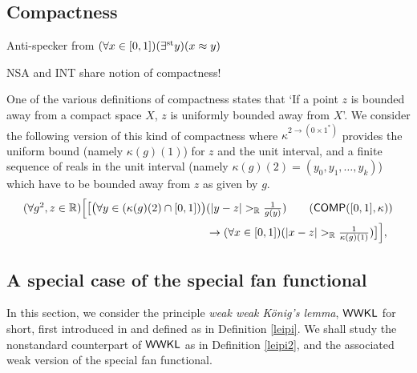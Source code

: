 \documentclass[reqno]{amsart}
\def\STP{\textup{\textsf{STP}}}
\def\WKL{\textup{\textsf{WKL}}}
\def\WWKL{\textup{\textsf{WWKL}}}
\def\R{{\mathbb  R}}
\def\st{\textup{st}}
\def\di{\rightarrow}
\def\paai{\Pi_{1}^{0}\textup{-\textsf{TRANS}}}
\numberwithin{equation}{section}
\numberwithin{thm}{section}
\begin{document}
\subsection{Compactness}



Anti-specker from $(\forall x\in [0,1])(\exists^{\st}y)(x\approx y)$


\medskip

NSA and INT share notion of compactness!  

\medskip


\medskip\newpage

One of the various definitions of compactness states that `If a point $z$ is bounded away from a compact space $X$, $z$ is uniformly bounded away from $X$'.  
We consider the following version of this kind of compactness where $\kappa^{2\di (0\times 1^{*})}$ provides the uniform bound (namely $\kappa(g)(1)$) for $z$ and the unit interval, and a finite sequence of reals in the unit interval (namely $\kappa(g)(2)=(y_{0}, y_{1}, \dots, y_{k})$) which have to be bounded away from $z$ as given by $g$.   
\begin{align}\textstyle
(\forall g^{2}, z\in \R)
\Big[\big[ \big(\forall y\in ( \kappa(g)(2)\cap [0,1])\big)&\textstyle (|y-z|>_{\R} \frac{1}{g(y)})\tag{$\textsf{COMP}([0,1], \kappa)$} \label{kalkuttttt2}\\
&\textstyle\di (\forall x\in [0,1])(|x-z|>_{\R}\frac{1}{\kappa(g)(1)})   \big]\Big],\notag
\end{align}


%
\subsection{A special case of the special fan functional}
In this section, we consider the principle \emph{weak weak K\"onig's lemma}, $\WWKL$ for short, first introduced in \cite{yussie} and defined as in Definition \ref{leipi}.
We shall study the nonstandard counterpart of $\WWKL$ as in Definition \ref{leipi2}, and the associated weak version of the special fan functional.  
\end{document}
